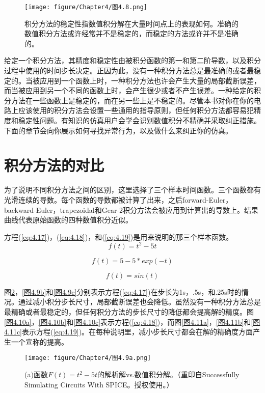 \begin{figure}[htbp]
\small
    \centering
    \texttt{[image: figure/Chapter4/图4.8.png]}
    \caption{积分方法的稳定性指数值积分解在大量时间点上的表现如何。准确的数值积分方法或许经常并不是稳定的，而稳定的方法或许并不是准确的。}
    \label{图4.8}
\end{figure}

给定一个积分方法，其精度和稳定性由被积分函数的第一和第二阶导数，以及积分过程中使用的时间步长决定。正因为此，没有一种积分方法总是最准确的或者最稳定的。当被应用到一个函数上时，一种积分方法也许会产生大量的局部截断误差，而当被应用到另一个不同的函数上时，会产生很少或者不产生误差。一种给定的积分方法在一些函数上是稳定的，而在另一些上是不稳定的。尽管本书对你在你的电路上应该使用的积分方法会设置一些通用的指导原则，但任何积分方法都容易犯精度和稳定性问题。有知识的仿真用户会学会识别数值积分不精确并采取纠正措施。下面的章节会向你展示如何寻找异常行为，以及做什么来纠正你的仿真。

\section{积分方法的对比}
为了说明不同积分方法之间的区别，这里选择了三个样本时间函数。三个函数都有光滑连续的导数。每个函数的导数都被计算了出来，之后forward-Euler，backward-Euler，trapezoidal和Gear-2积分方法会被应用到计算出的导数上。结果曲线代表原始函数的四种数值积分近似。

方程(\ref{eq:4.17})，(\ref{eq:4.18})，和(\ref{eq:4.19})是用来说明的那三个样本函数。
\begin{equation}
    f(t)=t^2-5t
    \label{eq:4.17}
\end{equation}

\begin{equation}
    f(t)=5-5*exp(-t)
    \label{eq:4.18}
\end{equation}

\begin{equation}
    f(t)=sin(t)
    \label{eq:4.19}
\end{equation}

图\ref{图4.9a}，\ref{图4.9b}和\ref{图4.9c}分别表示方程(\ref{eq:4.17})在步长为1s，.5s，和.25s时的情况。通过减小积分步长尺寸，局部截断误差也会降低。虽然没有一种积分方法总是最精确或者最稳定的，但任何积分方法的步长尺寸的降低都会提高解的精度。图\ref{图4.10a}，\ref{图4.10b}和\ref{图4.10c}表示方程(\ref{eq:4.18})，而图\ref{图4.11a}，\ref{图4.11b}和\ref{图4.11c}表示方程(\ref{eq:4.19})。在每种说明里，减小步长尺寸都会在解的精确度方面产生一个宣称的提高。
\begin{figure}[htbp]
\small
    \centering
    \texttt{[image: figure/Chapter4/图4.9a.png]}
    \caption{(a)函数$F(t)=t^2-5t$的解析解vs.数值积分解。（重印自Successfully Simulating Circuits With SPICE。授权使用。）}
    \label{图4.9a}
\end{figure}

